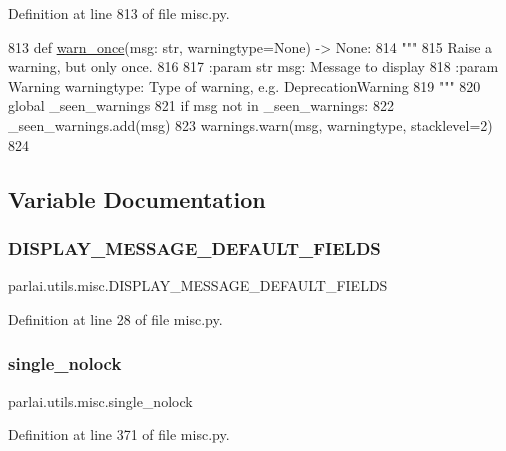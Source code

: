 Definition at line 813 of file misc.\+py.


\begin{DoxyCode}
813 \textcolor{keyword}{def }\hyperlink{namespaceparlai_1_1utils_1_1misc_a884a3aefa90581f53bc592fa6a78dc43}{warn\_once}(msg: str, warningtype=\textcolor{keywordtype}{None}) -> \textcolor{keywordtype}{None}:
814     \textcolor{stringliteral}{"""}
815 \textcolor{stringliteral}{    Raise a warning, but only once.}
816 \textcolor{stringliteral}{}
817 \textcolor{stringliteral}{    :param str msg: Message to display}
818 \textcolor{stringliteral}{    :param Warning warningtype: Type of warning, e.g. DeprecationWarning}
819 \textcolor{stringliteral}{    """}
820     \textcolor{keyword}{global} \_seen\_warnings
821     \textcolor{keywordflow}{if} msg \textcolor{keywordflow}{not} \textcolor{keywordflow}{in} \_seen\_warnings:
822         \_seen\_warnings.add(msg)
823         warnings.warn(msg, warningtype, stacklevel=2)
824 \end{DoxyCode}


\subsection{Variable Documentation}
\mbox{\label{namespaceparlai_1_1utils_1_1misc_a122146c75d0e6910340a6a851d097bdc}} 
\subsubsection{\texorpdfstring{D\+I\+S\+P\+L\+A\+Y\+\_\+\+M\+E\+S\+S\+A\+G\+E\+\_\+\+D\+E\+F\+A\+U\+L\+T\+\_\+\+F\+I\+E\+L\+DS}{DISPLAY\_MESSAGE\_DEFAULT\_FIELDS}}
{\footnotesize\ttfamily parlai.\+utils.\+misc.\+D\+I\+S\+P\+L\+A\+Y\+\_\+\+M\+E\+S\+S\+A\+G\+E\+\_\+\+D\+E\+F\+A\+U\+L\+T\+\_\+\+F\+I\+E\+L\+DS}



Definition at line 28 of file misc.\+py.

\mbox{\label{namespaceparlai_1_1utils_1_1misc_a5d6ad7f3aef96f16bb9060f5a41fc39b}} 
\subsubsection{\texorpdfstring{single\+\_\+nolock}{single\_nolock}}
{\footnotesize\ttfamily parlai.\+utils.\+misc.\+single\+\_\+nolock}



Definition at line 371 of file misc.\+py.

